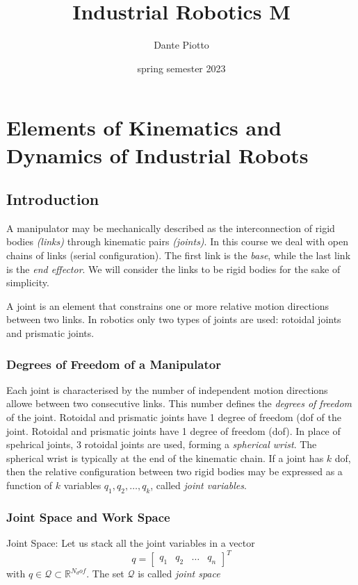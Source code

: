 \documentclass{book}
\title{Industrial Robotics M}
\author{Dante Piotto}
\date{spring semester 2023}
\begin{document}
\maketitle
\tableofcontents

\chapter{Elements of Kinematics and Dynamics of Industrial Robots}

\section{Introduction}
A manipulator may be mechanically described as the interconnection of rigid bodies \emph{(links)} through kinematic pairs \emph{(joints)}. In this course we deal with open chains of links (serial configuration). The first link is the \emph{base}, while the last link is the \emph{end effector}. We will consider the links to be rigid bodies for the sake of simplicity.

A joint is an element that constrains one or more relative motion directions between two links.
In robotics only two types of joints are used: rotoidal joints and prismatic joints.
\subsection{Degrees of Freedom of a Manipulator}
Each joint is characterised by the number of independent motion directions allowe between two consecutive links. This number defines the \emph{degrees of freedom} of the joint. Rotoidal and prismatic joints have 1 degree of freedom (dof of the joint. Rotoidal and prismatic joints have 1 degree of freedom (dof).
In place of spehrical joints, 3 rotoidal joints are used, forming a \emph{spherical wrist}. The spherical wrist is typically at the end of the kinematic chain.
If a joint has $k$ dof, then the relative configuration between two rigid bodies may be expressed as a function of $k$ variables $q_1, q_2, \dots, q_k$, called \emph{joint variables}.




\subsection{Joint Space and Work Space}
Joint Space: Let us stack all the joint variables in a vector \[q= \begin{bmatrix}
    q_1 & q_2 & \dots & q_n
\end{bmatrix}^T\] with $q\in \mathcal{Q}\subset \mathbb{R}^{N_dof}$. The set $\mathcal{Q}$ is called \emph{joint space}
\end{document}
